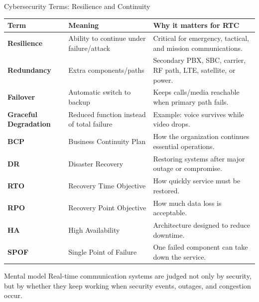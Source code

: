 \documentclass[aspectratio=169]{beamer}
\begin{document}
\begin{frame}{Cybersecurity Terms: Resilience and Continuity}
\tiny
\begin{tabular}{p{2.2cm} p{3.5cm} p{6.5cm}}
\toprule
\textbf{Term} & \textbf{Meaning} & \textbf{Why it matters for RTC} \\
\midrule
\textbf{Resilience} & Ability to continue under failure/attack & Critical for emergency, tactical, and mission communications. \\
\textbf{Redundancy} & Extra components/paths & Secondary PBX, SBC, carrier, RF path, LTE, satellite, or power. \\
\textbf{Failover} & Automatic switch to backup & Keeps calls/media reachable when primary path fails. \\
\textbf{Graceful Degradation} & Reduced function instead of total failure & Example: voice survives while video drops. \\
\textbf{BCP} & Business Continuity Plan & How the organization continues essential operations. \\
\textbf{DR} & Disaster Recovery & Restoring systems after major outage or compromise. \\
\textbf{RTO} & Recovery Time Objective & How quickly service must be restored. \\
\textbf{RPO} & Recovery Point Objective & How much data loss is acceptable. \\
\textbf{HA} & High Availability & Architecture designed to reduce downtime. \\
\textbf{SPOF} & Single Point of Failure & One failed component can take down the service. \\
\bottomrule
\end{tabular}

\vspace{0.15cm}
\begin{block}{Mental model}
Real-time communication systems are judged not only by security, but by whether they keep working when security events, outages, and congestion occur.
\end{block}
\end{frame}
\end{document}
